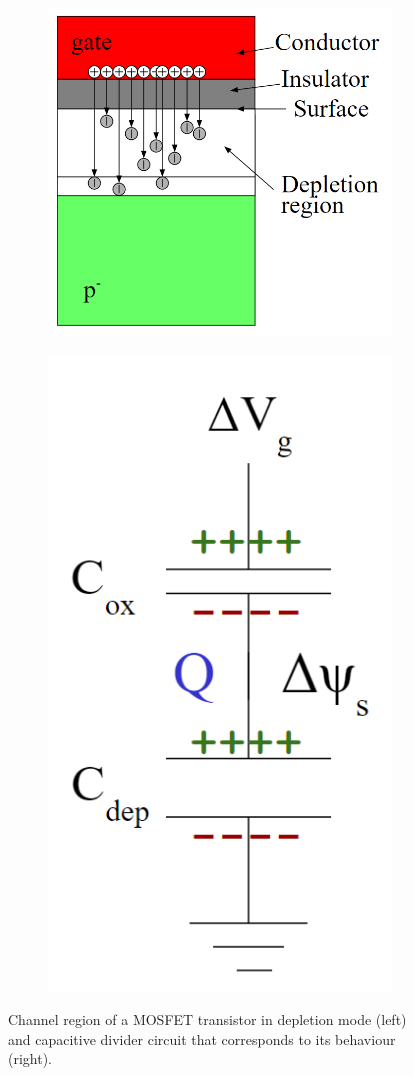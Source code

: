 \begin{figure}
\centering
\begin{subfigure}{.5\textwidth}
  \centering
  \includegraphics[width=.71\linewidth]{Figures/depletion_capacitor.PNG}
  \caption{}
  \label{fig:depletion_capacitor}
\end{subfigure}%
\begin{subfigure}{.5\textwidth}
  \centering
  \includegraphics[width=.36\linewidth]{Figures/depletion_capacitive_divider_circuit.PNG}
  \caption{}
  \label{fig:capacitive_divider_circuit}
\end{subfigure}
\caption{Channel region of a MOSFET transistor in depletion mode (left) and capacitive divider circuit that corresponds to its behaviour (right).}
\end{figure}

